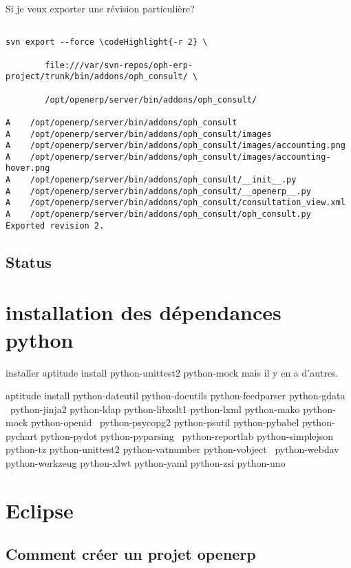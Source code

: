 \documentclass[12pt,a4paper]{article}
\newcommand\codeHighlight[1]{\textcolor[rgb]{1,0,0}{\textbf{#1}}}
\begin{document}
Si je veux exporter une révision particulière?

\begin{verbatim}

svn export --force \codeHighlight{-r 2} \

        file:///var/svn-repos/oph-erp-project/trunk/bin/addons/oph_consult/ \

        /opt/openerp/server/bin/addons/oph_consult/

A    /opt/openerp/server/bin/addons/oph_consult
A    /opt/openerp/server/bin/addons/oph_consult/images
A    /opt/openerp/server/bin/addons/oph_consult/images/accounting.png
A    /opt/openerp/server/bin/addons/oph_consult/images/accounting-hover.png
A    /opt/openerp/server/bin/addons/oph_consult/__init__.py
A    /opt/openerp/server/bin/addons/oph_consult/__openerp__.py
A    /opt/openerp/server/bin/addons/oph_consult/consultation_view.xml
A    /opt/openerp/server/bin/addons/oph_consult/oph_consult.py
Exported revision 2.
\end{verbatim}

\subsection{Status}
\label{sec:status}

\section{installation des dépendances python}
\label{sec:deppython}

installer 
aptitude install python-unittest2 python-mock mais il y en a d'autres.


aptitude install python-dateutil python-docutils python-feedparser python-gdata \
python-jinja2 python-ldap python-libxslt1 python-lxml python-mako python-mock python-openid \
python-psycopg2 python-psutil python-pybabel python-pychart python-pydot python-pyparsing \
python-reportlab python-simplejson python-tz python-unittest2 python-vatnumber python-vobject \
python-webdav python-werkzeug python-xlwt python-yaml python-zsi python-uno
\section{Eclipse}
\label{sec:eclipse}

\subsection{Comment créer un projet openerp}
\label{sec:create_project}
\end{document}
